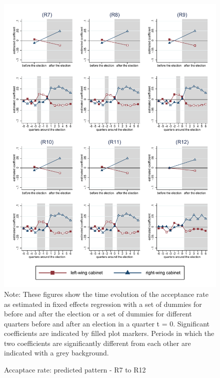 \documentclass[11pt,a4paper]{scrartcl}
\begin{document}
%
%
%
%
%
%
%
%
%




\clearpage
\FloatBarrier


\clearpage
\FloatBarrier
\begin{figure}[!ht]
	\caption{Accaptace rate: predicted pattern - R7 to R12}
	\includegraphics[width=1\textwidth]{../results/decisions/acceptance_rate_graphs_R7-R12.pdf}
	\scriptsize{Note: These figures show the time evolution of the acceptance rate as estimated in fixed effects regression with a set of dummies for before and after the election or a set of dummies for different quarters before and after an election in a quarter t = 0. Significant coefficients are indicated by filled plot markers. Periods in which the two coefficients are significantly different from each other are indicated with a grey background.}
\end{figure}
\end{document}
